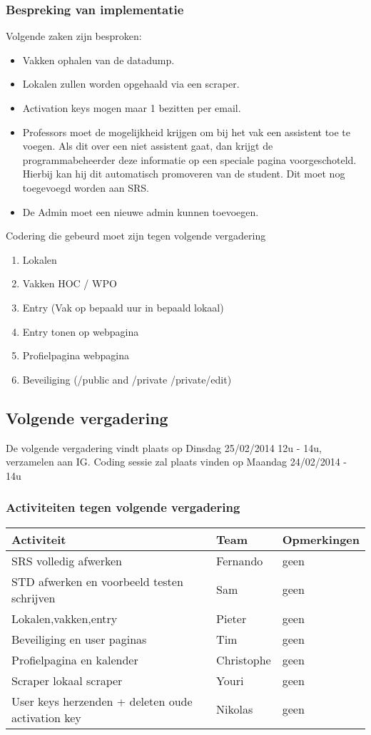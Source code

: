 \subsubsection{Bespreking van implementatie}
Volgende zaken zijn besproken:
\begin{itemize}
	\item Vakken ophalen van de datadump.
	\item Lokalen zullen worden opgehaald via een scraper.
	\item Activation keys mogen maar 1 bezitten per email.
	\item Professors moet de mogelijkheid krijgen om bij het vak een assistent toe te voegen. Als dit over een niet assistent gaat, dan krijgt de programmabeheerder deze informatie op een speciale pagina voorgeschoteld. Hierbij kan hij dit automatisch promoveren van de student. Dit moet nog toegevoegd worden aan SRS.
	\item De Admin moet een nieuwe admin kunnen toevoegen.
\end{itemize}

Codering die gebeurd moet zijn tegen volgende vergadering
\begin{enumerate}
	\item Lokalen
	\item Vakken HOC / WPO
	\item Entry (Vak op bepaald uur in bepaald lokaal)
	\item Entry tonen op webpagina
	\item Profielpagina webpagina
	\item Beveiliging (/public and /private /private/edit)
\end{enumerate}

\subsection{Volgende vergadering}
De volgende vergadering vindt plaats op Dinsdag 25/02/2014 12u - 14u, verzamelen aan IG.
Coding sessie zal plaats vinden op Maandag 24/02/2014 - 14u
\subsubsection{Activiteiten tegen volgende vergadering} \label{sec:TODOActiviteiten}
\begin{table} [H]
	\centering
	\begin{tabular} {l|l|l}
		\textbf{Activiteit} & \textbf{Team} & \textbf{Opmerkingen} \\
		\hline
		SRS volledig afwerken & Fernando & geen \\
		STD afwerken en voorbeeld testen schrijven & Sam & geen \\
		Lokalen,vakken,entry & Pieter & geen \\
		Beveiliging en user paginas & Tim & geen \\
		Profielpagina en kalender & Christophe & geen \\
		Scraper lokaal scraper & Youri & geen \\
		User keys herzenden + deleten oude activation key & Nikolas & geen \\
	\end{tabular}
\end{table}

